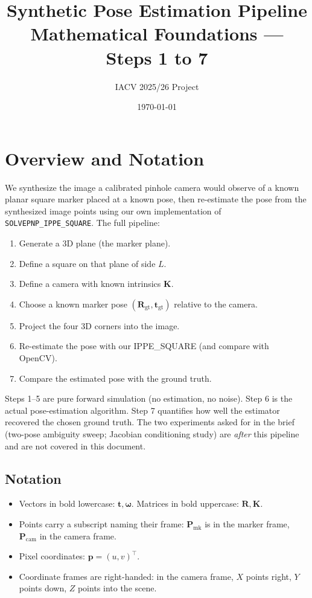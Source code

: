 \documentclass[11pt]{article}
\title{Synthetic Pose Estimation Pipeline \\[0.3em]
       \large Mathematical Foundations --- Steps 1 to 7}
\author{IACV 2025/26 Project}
\date{\today}
\newcommand{\Rgt}{\mathbf{R}_{\text{gt}}}
\newcommand{\tgt}{\mathbf{t}_{\text{gt}}}
\newcommand{\Pcam}{\mathbf{P}_{\text{cam}}}
\newcommand{\Pmark}{\mathbf{P}_{\text{mk}}}
\newcommand{\KK}{\mathbf{K}}
\begin{document}
\maketitle
\tableofcontents
\vspace{1em}

\section{Overview and Notation}

We synthesize the image a calibrated pinhole camera would observe of a
known planar square marker placed at a known pose, then re-estimate the
pose from the synthesized image points using our own implementation of
\verb|SOLVEPNP_IPPE_SQUARE|. The full pipeline:

\begin{enumerate}[label=\textbf{Step \arabic*.}, leftmargin=*]
  \item Generate a 3D plane (the marker plane).
  \item Define a square on that plane of side $L$.
  \item Define a camera with known intrinsics $\KK$.
  \item Choose a known marker pose $(\Rgt, \tgt)$ relative to the camera.
  \item Project the four 3D corners into the image.
  \item Re-estimate the pose with our IPPE\_SQUARE (and compare with OpenCV).
  \item Compare the estimated pose with the ground truth.
\end{enumerate}

Steps 1--5 are pure forward simulation (no estimation, no noise). Step 6 is
the actual pose-estimation algorithm. Step 7 quantifies how well the
estimator recovered the chosen ground truth. The two experiments asked for
in the brief (two-pose ambiguity sweep; Jacobian conditioning study) are
\emph{after} this pipeline and are not covered in this document.

\subsection*{Notation}
\begin{itemize}[leftmargin=*]
  \item Vectors in bold lowercase: $\mathbf{t}, \boldsymbol{\omega}$. Matrices in bold uppercase: $\mathbf{R}, \KK$.
  \item Points carry a subscript naming their frame:
        $\Pmark$ is in the marker frame, $\Pcam$ in the camera frame.
  \item Pixel coordinates: $\mathbf{p} = (u, v)^\top$.
  \item Coordinate frames are right-handed: in the camera frame, $X$ points right,
        $Y$ points down, $Z$ points into the scene.
\end{itemize}
\end{document}
